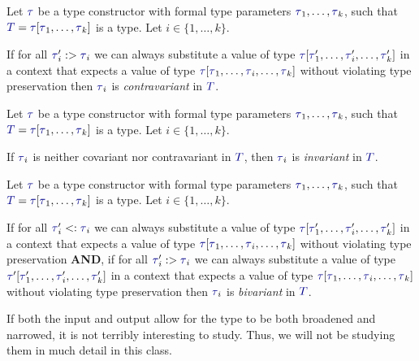 \begin{definition}[Contravariance]\label{Type_Contravariance}
  Let $\DataType$ be a type constructor with formal type parameters $\DataType_{1}, \ldots , \DataType_{k}$, such that $\SemanticType{T} = \DataType [\DataType_{1}, \ldots, \DataType_{k}]$ is a type.
  Let $i \in \lbrace 1,\ldots, k \rbrace$.

  If for all $\DataType_{i}' :> \DataType_{i}$ we can always substitute a value of type $\DataType [\DataType_{1}',\ldots, \DataType_{i}', \ldots, \DataType_{k}']$ in a context that expects a value of type $\DataType [\DataType_{1}, \ldots, \DataType_{i}, \ldots, \DataType_{k}]$ without violating type preservation then $\DataType_{i}$ is \emph{contravariant} in $\SemanticType{T}$.
\end{definition}

\begin{definition}[Invariance]\label{def:Type_Invariance}
  Let $\DataType$ be a type constructor with formal type parameters $\DataType_{1}, \ldots , \DataType_{k}$, such that $\SemanticType{T} = \DataType [\DataType_{1}, \ldots, \DataType_{k}]$ is a type.
  Let $i \in \lbrace 1,\ldots, k \rbrace$.


  If $\DataType_{i}$ is neither covariant nor contravariant in $\SemanticType{T}$, then $\DataType_{i}$ is \emph{invariant} in $\SemanticType{T}$.
\end{definition}

\begin{definition}[Bivariance]\label{def:Type_Bivariance}
  Let $\DataType$ be a type constructor with formal type parameters $\DataType_{1}, \ldots , \DataType_{k}$, such that $\SemanticType{T} = \DataType [\DataType_{1}, \ldots, \DataType_{k}]$ is a type.
  Let $i \in \lbrace 1,\ldots, k \rbrace$.

  If for all $\DataType_{i}' <: \DataType_{i}$ we can always substitute a value of type $\DataType [\DataType_{1}',\ldots, \DataType_{i}', \ldots, \DataType_{k}']$ in a context that expects a value of type $\DataType [\DataType_{1}, \ldots, \DataType_{i}, \ldots, \DataType_{k}]$ without violating type preservation \textbf{AND}, if for all $\DataType_{i}' :> \DataType_{i}$ we can always substitute a value of type $\DataType' [\DataType_{1}', \ldots, \DataType_{i}', \ldots, \DataType_{k}']$ in a context that expects a value of type $\DataType [\DataType_{1}, \ldots, \DataType_{i}, \ldots, \DataType_{k}]$ without violating type preservation then $\DataType_{i}$ is \emph{bivariant} in $\SemanticType{T}$.

  \begin{remark}
    If both the input and output allow for the type to be both broadened and narrowed, it is not terribly interesting to study.
    Thus, we will not be studying them in much detail in this class.
  \end{remark}
\end{definition}
